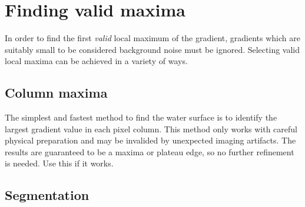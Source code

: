 \section{Finding valid maxima} \label{sec:valid-maxima}
\par
In order to find the first {\em valid} local maximum of the gradient, gradients which are suitably small to be considered background noise must be ignored.
Selecting valid local maxima can be achieved in a variety of ways.

\subsection{Column maxima} \label{sec:column-max}
\par
The simplest and fastest method to find the water surface is to identify the largest gradient value in each pixel column.
This method only works with careful physical preparation and may be invalided by unexpected imaging artifacts.
The results are guaranteed to be a maxima or plateau edge, so no further refinement is needed.
Use this if it works.

\subsection{Segmentation} \label{sec:segmentation}
\par

